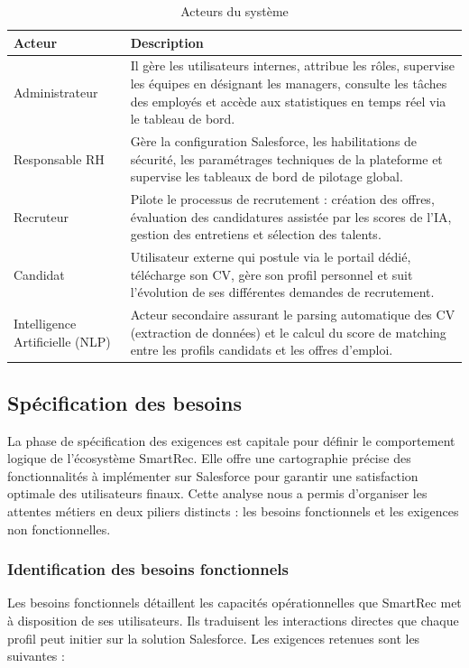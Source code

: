  \begin{table}[H]
 \captionsetup{justification=centering}
\caption{Acteurs du système}
\label{tab:acteurs}
\centering
\begin{tabular}{|m{4cm}|m{12cm}|}
\hline 
\centering \textbf{Acteur} & \textbf{Description} \\
\hline Administrateur  & 
Il gère les utilisateurs internes, attribue les rôles, supervise les équipes en désignant les managers, consulte les tâches des employés et accède aux statistiques en temps réel via le tableau de bord.\\
\hline Responsable RH & 
Gère la configuration Salesforce, les habilitations de sécurité, les paramétrages techniques de la plateforme et supervise les tableaux de bord de pilotage global.\\
\hline Recruteur  & 
Pilote le processus de recrutement : création des offres, évaluation des candidatures assistée par les scores de l'IA, gestion des entretiens et sélection des talents.\\
\hline Candidat  &
Utilisateur externe qui postule via le portail dédié, télécharge son CV, gère son profil personnel et suit l’évolution de ses différentes demandes de recrutement.\\
\hline Intelligence Artificielle (NLP)&
Acteur secondaire assurant le parsing automatique des CV (extraction de données) et le calcul du score de matching entre les profils candidats et les offres d'emploi.\\
\hline 
\end{tabular}
\end{table}
\subsection{Spécification des besoins}

La phase de spécification des exigences est capitale pour définir le comportement logique de l'écosystème SmartRec. Elle offre une cartographie précise des fonctionnalités à implémenter sur Salesforce pour garantir une satisfaction optimale des utilisateurs finaux. Cette analyse nous a permis d'organiser les attentes métiers en deux piliers distincts : les besoins fonctionnels et les exigences non fonctionnelles.

\subsubsection{Identification des besoins fonctionnels}
Les besoins fonctionnels détaillent les capacités opérationnelles que SmartRec met à disposition de ses utilisateurs. Ils traduisent les interactions directes que chaque profil peut initier sur la solution Salesforce. Les exigences retenues sont les suivantes :

